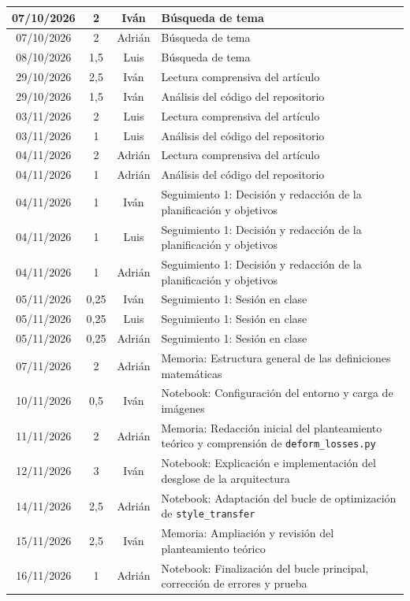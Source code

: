 \documentclass[a4paper]{article}
\begin{document}
\begin{longtable}{|c|c|c|>{\centering\arraybackslash}p{}|}
07/10/2026 & 2 & Iván & Búsqueda de tema\\\hline
07/10/2026 & 2 & Adrián & Búsqueda de tema\\\hline
08/10/2026 & 1,5 & Luis & Búsqueda de tema\\\hline
29/10/2026 & 2,5 & Iván & Lectura comprensiva del artículo\\\hline
29/10/2026 & 1,5 & Iván & Análisis del código del repositorio\\\hline
03/11/2026 & 2 & Luis & Lectura comprensiva del artículo\\\hline
03/11/2026 & 1 & Luis & Análisis del código del repositorio\\\hline
04/11/2026 & 2 & Adrián & Lectura comprensiva del artículo\\\hline
04/11/2026 & 1 & Adrián & Análisis del código del repositorio\\\hline
04/11/2026 & 1 & Iván & Seguimiento 1: Decisión y redacción de la planificación y objetivos\\\hline
04/11/2026 & 1 & Luis & Seguimiento 1: Decisión y redacción de la planificación y objetivos\\\hline
04/11/2026 & 1 & Adrián & Seguimiento 1: Decisión y redacción de la planificación y objetivos\\\hline
05/11/2026 & 0,25 & Iván & Seguimiento 1: Sesión en clase\\\hline
05/11/2026 & 0,25 & Luis & Seguimiento 1: Sesión en clase\\\hline
05/11/2026 & 0,25 & Adrián & Seguimiento 1: Sesión en clase\\\hline
07/11/2026 & 2 & Adrián & Memoria: Estructura general de las definiciones matemáticas\\\hline
10/11/2026 & 0,5 & Iván & Notebook: Configuración del entorno y carga de imágenes\\\hline
11/11/2026 & 2 & Adrián & Memoria: Redacción inicial del planteamiento teórico y comprensión de \texttt{deform\_losses.py}\\\hline
12/11/2026 & 3 & Iván & Notebook: Explicación e implementación del desglose de la arquitectura\\\hline
14/11/2026 & 2,5 & Adrián & Notebook: Adaptación del bucle de optimización de \texttt{style\_transfer}\\\hline
15/11/2026 & 2,5 & Iván & Memoria: Ampliación y revisión del planteamiento teórico\\\hline
16/11/2026 & 1 & Adrián & Notebook: Finalización del bucle principal, corrección de errores y prueba\\\hline

\end{longtable}
\end{document}
